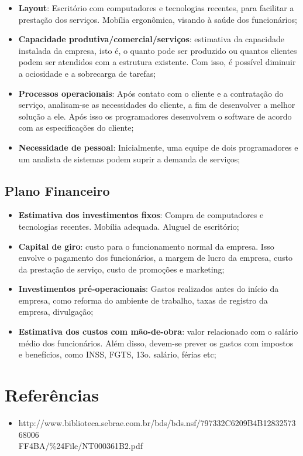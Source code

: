 \documentclass[12pt]{article}
\begin{document}
\begin{itemize}

	\item \textbf{Layout}: Escritório com computadores e tecnologias recentes, para facilitar a prestação dos serviços. Mobília ergonômica,
	visando à saúde dos funcionários;
	
	\item \textbf{Capacidade produtiva/comercial/serviços}: estimativa da capacidade instalada da empresa, isto é, o quanto pode ser produzido
	ou quantos clientes podem ser atendidos com a estrutura existente. Com isso, é possível diminuir a ociosidade e a sobrecarga de tarefas;
	
	\item \textbf{Processos operacionais}: Após contato com o cliente e a contratação do serviço, analisam-se as necessidades do cliente, a fim
	de desenvolver a melhor solução a ele. Após isso os programadores desenvolvem o software de acordo com as especificações do cliente;
	
	\item \textbf{Necessidade de pessoal}: Inicialmente, uma equipe de dois programadores e um analista de sistemas podem suprir a demanda de serviços;

\end{itemize}




\subsection{Plano Financeiro}


\begin{itemize}

	\item \textbf{Estimativa dos investimentos fixos}: Compra de computadores e tecnologias recentes. Mobília adequada. Aluguel de escritório;
	
	\item \textbf{Capital de giro}: custo para o funcionamento normal da empresa. Isso envolve o pagamento dos funcionários, a margem de lucro
	da empresa, custo da prestação de serviço, custo de promoções e marketing;
	
	\item \textbf{Investimentos pré-operacionais}: Gastos realizados antes do início da empresa, como reforma do ambiente de trabalho, taxas
	de registro da empresa, divulgação;
	
	\item \textbf{Estimativa dos custos com mão-de-obra}: valor relacionado com o salário médio dos funcionários. Além disso, devem-se prever
	os gastos com impostos e benefícios, como INSS, FGTS, 13o. salário, férias etc;
	
\end{itemize}



\section{Referências}

\begin{itemize}

	\item http://www.biblioteca.sebrae.com.br/bds/bds.nsf/797332C6209B4B1283257368006\\FF4BA/\%24File/NT000361B2.pdf

\end{itemize}
\end{document}
